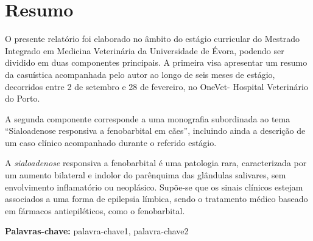
\section*{Resumo}


O presente relatório foi elaborado no âmbito do estágio curricular do Mestrado Integrado em Medicina Veterinária da Universidade de Évora, podendo ser dividido em duas componentes principais. A primeira visa apresentar um resumo da casuística acompanhada pelo autor ao longo de seis meses de estágio, decorridos entre 2 de setembro e 28 de fevereiro, no OneVet- Hospital Veterinário do Porto.

A segunda componente corresponde a uma monografia subordinada ao tema “Sialoadenose responsiva a fenobarbital em cães”, incluindo ainda a descrição de um caso clínico acompanhado durante o referido estágio.

A \textit{sialoadenose} responsiva a fenobarbital é uma patologia rara, caracterizada por um aumento bilateral e indolor do parênquima das glândulas salivares, sem envolvimento inflamatório ou neoplásico. Supõe-se que os sinais clínicos estejam associados a uma forma de epilepsia límbica, sendo o tratamento médico baseado em fármacos antiepiléticos, como o fenobarbital. 

\vfill

\textbf{\Large Palavras-chave:} palavra-chave1, palavra-chave2

